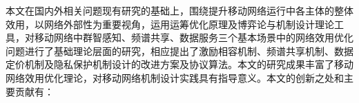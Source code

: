 本文在国内外相关问题现有研究的基础上，围绕提升移动网络运行中各主体的整体效用，以网络外部性为重要视角，运用运筹优化原理及博弈论与机制设计理论工具，对移动网络中群智感知、频谱共享、数据服务三个基本场景中的网络效用优化问题进行了基础理论层面的研究，相应提出了激励相容机制、频谱共享机制、数据定价机制及隐私保护机制设计的改进方案及协议算法。本文的研究成果丰富了移动网络效用优化理论，对移动网络机制设计实践具有指导意义。本文的创新之处和主要贡献有：

\begin{enumerate}

\end{enumerate}
